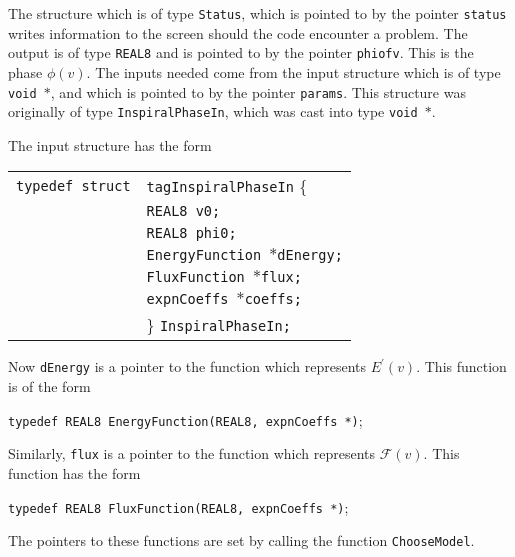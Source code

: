 \documentclass[12pt]{article}
\begin{document}
The structure which is of type \texttt{Status}, which is pointed to by the pointer \texttt{status} writes information to the screen should the code encounter a problem. The output is of type \texttt{REAL8} and is pointed to by the pointer \texttt{phiofv}. This is the phase $\phi(v)$.
The inputs needed come from the input structure which is of type \texttt{void $\ast$}, and which is pointed to by the pointer \texttt{params}. This structure was originally of type \texttt{InspiralPhaseIn}, which was cast into type \texttt{void $\ast$}.

The input structure has the form

\vspace{5mm}

\begin{tabular}{ll}
\texttt{typedef struct} & \texttt{tagInspiralPhaseIn} \{ \\
                        & \texttt{REAL8 v0;} \\
                        & \texttt{REAL8 phi0;} \\
                        & \texttt{EnergyFunction $\ast$dEnergy;}  \\
                        & \texttt{FluxFunction $\ast$flux;}  \\
                        & \texttt{expnCoeffs $\ast$coeffs;}  \\
                        & \} \texttt{InspiralPhaseIn;}
\end{tabular}

\vspace{5mm}


Now \texttt{dEnergy} is a pointer to the function which represents $E^{\prime}(v)$. This function is of the form

\vspace{5mm}

\texttt{typedef REAL8 EnergyFunction(REAL8, expnCoeffs *)};

\vspace{5mm}

Similarly, \texttt{flux} is a pointer to the function which represents $\mathcal{F}(v)$. This function has the form

\vspace{5mm}

\texttt{typedef REAL8 FluxFunction(REAL8, expnCoeffs *)};

\vspace{5mm}

The pointers to these functions are set by calling the function \texttt{ChooseModel}.
\end{document}
